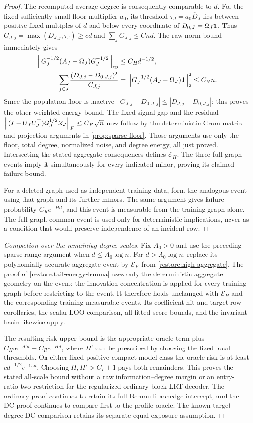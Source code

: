\begin{proof}
The recomputed average degree is consequently comparable to $d$.
For the fixed sufficiently small floor multiplier $a_0$, its threshold
$\tau_J=a_0\overline D_J$ lies between positive fixed multiples of
$d$ and below every coordinate of $D_{0,J}=\Omega_J\mathbf 1$.
Thus $G_{J,j}=\max(D_{J,j},\tau_J)\ge cd$ and
$\sum_jG_{J,j}\le Cnd$. The raw norm bound immediately gives
\begin{align*}
 \left\lVert G_J^{-1/2}(A_J-\Omega_J)G_J^{-1/2}\right\rVert_{\mathrm{op}}
   &\le C_Hd^{-1/2},\\
 \sum_{j\in J}\frac{(D_{J,j}-D_{0,J,j})^2}{G_{J,j}}
   &=\left\lVert G_J^{-1/2}(A_J-\Omega_J)\mathbf 1\right\rVert_2^2
     \le C_Hn.
\end{align*}
Since the population floor is inactive,
$|G_{J,j}-D_{0,J,j}|\le|D_{J,j}-D_{0,J,j}|$; this proves the
other weighted energy bound. The fixed signal gap and the residual
$\left\lVert(I-U_JU_J^\top)G_J^{1/2}Z_J\right\rVert_F\le C_H\sqrt n$
now follow by the deterministic Gram-matrix and projection arguments
in \cref{prop:sparse-floor}. Those arguments use only the floor,
total degree, normalized noise, and degree energy, all just proved.
Intersecting the stated aggregate consequences defines
$\mathcal E_H$. The three full-graph events imply it simultaneously
for every indicated minor, proving its claimed failure bound.

For a deleted graph used as independent training data, form the
analogous event using that graph and its further minors. The same
argument gives failure probability $C_He^{-Hd}$, and this event is
measurable from the training graph alone. The full-graph common event
is used only for deterministic implications, never as a condition
that would preserve independence of an incident row.
\end{proof}

\begin{proof}[Completion over the remaining degree scales]
Fix $A_0>0$ and use the preceding sparse-range argument when
$d\le A_0\log n$. For $d>A_0\log n$, replace its polynomially
accurate aggregate event by $\mathcal E_H$ from
\cref{restore:high-aggregate}. The proof of
\cref{restore:tail-energy-lemma} uses only the deterministic aggregate
geometry on the event; the innovation concentration is applied for
every training graph before restricting to the event. It therefore
holds unchanged with $\mathcal E_H$ and the corresponding
training-measurable events. Its coefficient-hit and target-row
corollaries, the scalar LOO comparison, all fitted-score bounds,
and the invariant basin likewise apply.

The resulting risk upper bound is the appropriate oracle term plus
$C_{H'}e^{-H'd}+C_He^{-Hd}$, where $H'$ can be prescribed by choosing
the fixed local thresholds. On either fixed positive compact model
class the oracle risk is at least $cd^{-1/2}e^{-C_Id}$.
Choosing $H,H'>C_I+1$ pays both remainders. This proves the stated
all-scale bound without a raw information--degree margin or an
entry-ratio-two restriction for the regularized ordinary block-LRT
decoder. The ordinary proof continues to retain its full Bernoulli
nonedge intercept, and the DC proof continues to compare first to
the profile oracle. The known-target-degree DC comparison retains
its separate equal-exposure assumption.
\end{proof}
